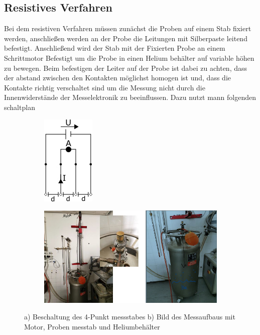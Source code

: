     \subsection*{Resistives Verfahren}
    Bei dem resistiven Verfahren müssen zunächst die Proben auf einem Stab fixiert werden, anschließen werden
    an der Probe die Leitungen mit Silberpaste leitend befestigt. Anschließend wird der Stab mit der Fixierten
    Probe an einem Schrittmotor Befestigt um die Probe in einen Helium behälter auf variable höhen zu bewegen.
    Beim befestigen der Leiter auf der Probe ist dabei zu achten, dass der abstand zwischen den Kontakten möglichst
    homogen ist und, dass die Kontakte richtig verschaltet sind um die Messung nicht durch die Innenwiderstände
    der Messelektronik zu beeinflussen. Dazu nutzt mann folgenden schaltplan
    \begin{figure}[H]
        \centering
        \begin{subfigure}{.5\textwidth}
        \centering
        \includegraphics[width=.4\linewidth]{images/schaltplan.png}
        \caption{}
        \label{fig:sub11}
        \end{subfigure}%
        \begin{subfigure}{.5\textwidth}
        \centering
        \includegraphics[width=.8\linewidth]{images/aufbaures.png}
        \caption{}
        \label{fig:sub22}
        \end{subfigure} 
        \caption{a) Beschaltung des 4-Punkt messstabes b) Bild des Messaufbaus mit Motor, Proben messtab und Heliumbehälter}
        \label{fig:test1}
    \end{figure}

